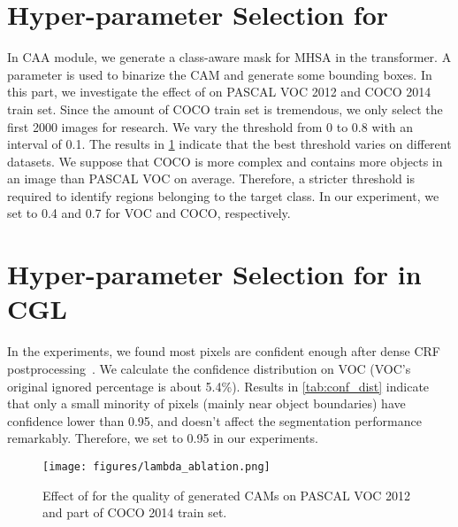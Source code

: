 \documentclass[10pt,twocolumn,letterpaper]{article}
\begin{document}
\section{Hyper-parameter Selection for }
In CAA module, we generate a class-aware mask for MHSA in the transformer. A parameter  is used to binarize the CAM and generate some bounding boxes. In this part, we investigate the effect of  on PASCAL VOC 2012 and COCO 2014 train set. Since the amount of COCO train set is tremendous, we only select the first 2000 images for research. We vary the threshold from 0 to 0.8 with an interval of 0.1. The results in \cref{fig:lambda_ablation} indicate that the best threshold varies on different datasets. We suppose that COCO is more complex and contains more objects in an image than PASCAL VOC on average. Therefore, a stricter threshold is required to identify regions belonging to the target class. In our experiment, we set  to 0.4 and 0.7 for VOC and COCO, respectively. 

\section{Hyper-parameter Selection for  in CGL}
In the experiments, we found most pixels are confident enough after dense CRF postprocessing~\cite{CRF}. We calculate the confidence distribution on VOC (VOC's original ignored percentage is about 5.4\%). Results in \cref{tab:conf_dist} indicate that only a small minority of pixels (mainly near object boundaries) have confidence lower than 0.95, and  doesn't affect the segmentation performance remarkably. Therefore, we set  to 0.95 in our experiments.

\begin{figure}[t]
  \centering
\texttt{[image: figures/lambda\_ablation.png]}

   \caption{Effect of  for the quality of generated CAMs on PASCAL VOC 2012 and part of COCO 2014 train set.}
   \label{fig:lambda_ablation}
\end{figure}


\begin{table}
  \centering
  \vspace{-2mm}
  \caption{The distribution of confidence and mIoU of final segmentation with different  on VOC 12.}
  \label{tab:conf_dist}
\end{table}
\end{document}
